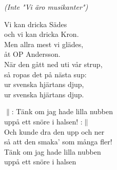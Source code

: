 \documentclass[a6paper,10pt]{article}
\begin{document}
\setlength{\oddsidemargin}{-0.47in}
\noindent
\begin{center}
    \textit{(Inte "Vi äro musikanter")}
\end{center}
\begin{lyrics}
Vi kan dricka Sädes \\
och vi kan dricka Kron. \\
Men allra mest vi glädes, \\
åt OP Andersson.
\vspace{5pt}\\
När den gått ned uti vår strup, \\
så ropas det på nästa sup: \\
ur svenska hjärtans djup, \\
ur svenska hjärtans djup. 
\end{lyrics}
\vspace{30pt}
\begin{center}
\end{center}
\begin{lyrics}
$\|$: Tänk om jag hade lilla nubben \\
uppå ett snöre i halsen! :$\|$
\vspace{5pt}\\
Och kunde dra den upp och ner \\
så att den smaka' som många fler! \\
Tänk om jag hade lilla nubben \\
uppå ett snöre i halsen 
\end{lyrics}
\end{document}
